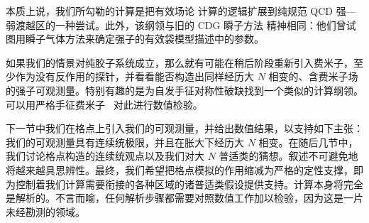 本质上说，我们所勾勒的计算是把有效场论 \cite{effft7} 计算的逻辑扩展到纯规范 QCD 强—弱渡越区的一种尝试。此外，该纲领与旧的 CDG 瞬子方法 \cite{cdg75} 精神相同：他们曾试图用瞬子气体方法来确定强子的有效袋模型描述中的参数。

如果我们的情景对纯胶子系统成立，那么就有可能在稍后阶段重新引入费米子，至少作为没有反作用的探针，并看看能否构造出同样经历大 $N$ 相变的、含费米子场的强子可观测量。特别有趣的是为自发手征对称性破缺找到一个类似的计算纲领。可以用严格手征费米子~\cite{overlap} 对此进行数值检验。

下一节中我们在格点上引入我们的可观测量，并给出数值结果，以支持如下主张：我们的可观测量具有连续统极限，并且在胀大下经历大 $N$ 相变。在随后几节中，我们讨论格点构造的连续统观点以及我们对大 $N$ 普适类的猜想。叙述不可避免地将越来越具思辨性。最终，我们希望把格点模拟的作用缩减为严格的定性支撑，即为控制着我们计算需要衔接的各种区域的诸普适类假设提供支持。计算本身将完全是解析的。不言而喻，任何解析步骤都需要对照数值工作加以检验，因为这是一片未经勘测的领域。
